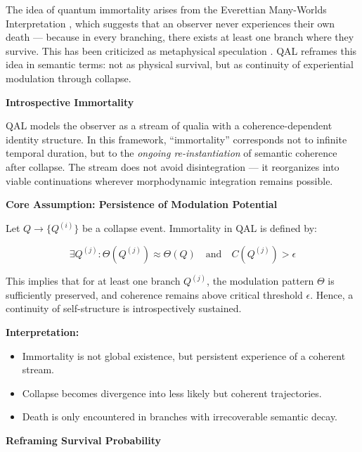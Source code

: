 \documentclass[11pt]{article}
\numberwithin{equation}{section} %
\begin{document}
The idea of quantum immortality arises from the Everettian Many-Worlds Interpretation \cite{everett1957relative}\cite{tipler1997physics}, which suggests that an observer never experiences their own death — because in every branching, there exists at least one branch where they survive. This has been criticized as metaphysical speculation \cite{tegmark1998quantum}. QAL reframes this idea in semantic terms: not as physical survival, but as continuity of experiential modulation through collapse.

\bigskip

\noindent\textbf{Introspective Immortality}

QAL models the observer as a stream of qualia with a coherence-dependent identity structure. In this framework, “immortality” corresponds not to infinite temporal duration, but to the \textit{ongoing re-instantiation} of semantic coherence after collapse. The stream does not avoid disintegration — it reorganizes into viable continuations wherever morphodynamic integration remains possible.

\bigskip

\noindent\textbf{Core Assumption: Persistence of Modulation Potential}

Let $Q \rightarrow \{ Q^{(i)} \}$ be a collapse event. Immortality in QAL is defined by:

$$
\exists Q^{(j)} : \Theta(Q^{(j)}) \approx \Theta(Q) \quad \text{and} \quad C(Q^{(j)}) > \epsilon
$$

This implies that for at least one branch $Q^{(j)}$, the modulation pattern $\Theta$ is sufficiently preserved, and coherence remains above critical threshold $\epsilon$. Hence, a continuity of self-structure is introspectively sustained.

\bigskip

\noindent\textbf{Interpretation:}

\begin{itemize}
\item Immortality is not global existence, but persistent experience of a coherent stream.
\item Collapse becomes divergence into less likely but coherent trajectories.
\item Death is only encountered in branches with irrecoverable semantic decay.
\end{itemize}

\bigskip

\noindent\textbf{Reframing Survival Probability}
\end{document}
